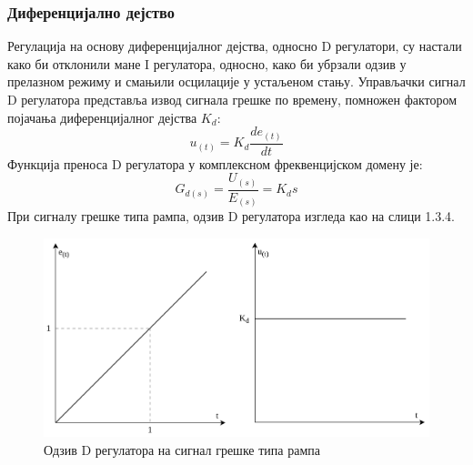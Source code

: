 \documentclass[12pt]{article}
\begin{document}
\subsubsection{Диференцијално дејство}
Регулација на основу диференцијалног дејства, односно D регулатори, су настали како би отклонили мане I регулатора, односно, како би убрзали одзив у прелазном режиму и смањили осцилације у устаљеном стању. Управљачки сигнал D регулатора представља извод сигнала грешке по времену, помножен фактором појачања диференцијалног дејства $K_d$:
\begin{equation}
    u_{(t)} = K_d\dfrac{de_{(t)}}{dt}
\end{equation}
Функција преноса D регулатора у комплексном фреквенцијском домену је:
\begin{equation}
    G_{d(s)} = \dfrac{U_{(s)}}{E_{(s)}} = K_ds
\end{equation}
При сигналу грешке типа рампа, одзив D регулатора изгледа као на слици 1.3.4.
\begin{figure}[H]
    \centering
    \includegraphics[width=13cm]{figures/d.drawio.png}
    \caption{Одзив D регулатора на сигнал грешке типа рампа}
    \label{fig:D_одзив}
\end{figure}
\end{document}

